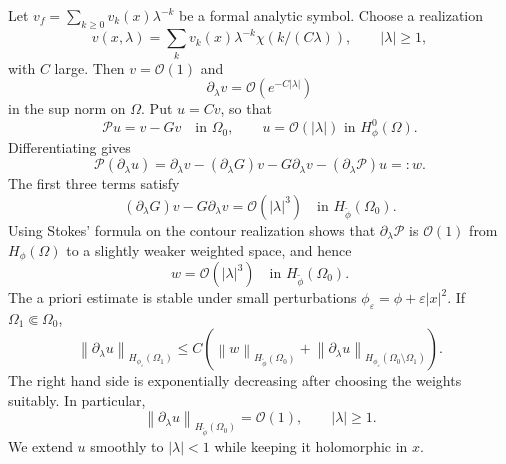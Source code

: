 \documentclass[11pt,a4paper]{article}
\newcommand{\cO}{\mathcal O}
\newcommand{\eps}{\varepsilon}
\newcommand{\norm}[1]{\left\lVert #1\right\rVert}
\numberwithin{equation}{section}
\theoremstyle{remark}
\begin{document}
Let $v_f=\sum_{k\ge0}v_k(x)\lambda^{-k}$ be a formal analytic symbol. Choose a realization
\[
v(x,\lambda)=\sum_kv_k(x)\lambda^{-k}\chi(k/(C\lambda)),\qquad|\lambda|\ge1,
\]
with $C$ large. Then $v=\cO(1)$ and
\begin{equation}
\partial_\lambda v=\cO(e^{-C|\lambda|})
\end{equation}
in the sup norm on $\Omega$. Put $u=Cv$, so that
\begin{equation}
\mathcal Pu=v-Gv\quad\text{in }\Omega_0,
\qquad u=\cO(|\lambda|)\text{ in }H^0_\phi(\Omega).
\end{equation}
Differentiating gives
\begin{equation}
\mathcal P(\partial_\lambda u)
=\partial_\lambda v-(\partial_\lambda G)v-G\partial_\lambda v
-(\partial_\lambda\mathcal P)u=:w.
\end{equation}
The first three terms satisfy
\begin{equation}
(\partial_\lambda G)v-G\partial_\lambda v
=\cO(|\lambda|^3)\quad\text{in }H_{\widetilde\phi}(\Omega_0).
\end{equation}
Using Stokes' formula on the contour realization shows that $\partial_\lambda\mathcal P$ is $\cO(1)$ from $H_\phi(\Omega)$ to a slightly weaker weighted space, and hence
\begin{equation}
w=\cO(|\lambda|^3)\quad\text{in }H_{\widetilde\phi}(\Omega_0).
\end{equation}
The a priori estimate is stable under small perturbations $\phi_\eps=\phi+\eps|x|^2$. If $\Omega_1\Subset\Omega_0$,
\begin{equation}
\norm{\partial_\lambda u}_{H_{\phi_\eps}(\Omega_1)}
\le C\left(
\norm w_{H_{\widetilde\phi}(\Omega_0)}+
\norm{\partial_\lambda u}_{H_{\phi_\eps}(\Omega_0\setminus\Omega_1)}
\right).
\end{equation}
The right hand side is exponentially decreasing after choosing the weights suitably. In particular,
\begin{equation}
\norm{\partial_\lambda u}_{H_{\widetilde\phi}(\Omega_0)}=\cO(1),
\qquad |\lambda|\ge1.
\end{equation}
We extend $u$ smoothly to $|\lambda|<1$ while keeping it holomorphic in $x$.
\end{document}
